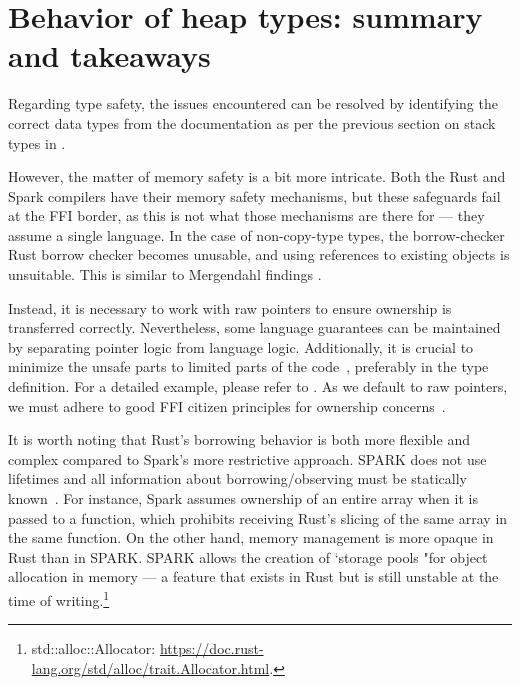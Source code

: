 \documentclass[nomenclature, english, bibtex]{kththesis}
\begin{document}
\section{Behavior of heap types: summary and takeaways}
\label{heap-types-behavior}

Regarding type safety, the issues encountered can be resolved by identifying the correct data types from the documentation as per the previous section on stack types in . 

However, the matter of memory safety is a bit more intricate. Both the Rust and Spark compilers have their memory safety mechanisms, but these safeguards fail at the \gls{FFI} border, as this is not what those mechanisms are there for --- they assume a single language. In the case of non-\gls{copy-type} types, the borrow-checker Rust borrow checker becomes unusable, and using references to existing objects is unsuitable. This is similar to Mergendahl \etal findings \cite{mergendahl_cross-language_2022}.

Instead, it is necessary to work with raw pointers to ensure ownership is transferred correctly. Nevertheless, some language guarantees can be maintained by separating pointer logic from language logic. Additionally, it is crucial to minimize the unsafe parts to limited parts of the code~\cite{miller_step_2018}, preferably in the type definition. For a detailed example, please refer to .
As we default to raw pointers, we must adhere to good FFI citizen principles for ownership concerns~\cite{gjengset_rust_2021, miller_step_2018}. 

It is worth noting that Rust's borrowing behavior is both more flexible and complex compared to Spark's more restrictive approach. SPARK does not use lifetimes and all information about borrowing/observing must be statically known~\cite{moy_proof_2019}. For instance, Spark assumes ownership of an entire array when it is passed to a function, which prohibits receiving Rust's slicing of the same array in the same function. 
On the other hand, memory management is more opaque in Rust than in SPARK. SPARK allows the creation of `storage pools "for object allocation in memory --- a feature that exists in Rust but is still unstable at the time of writing.\footnote{std::alloc::Allocator: \url{https://doc.rust-lang.org/std/alloc/trait.Allocator.html}.} 
\end{document}
